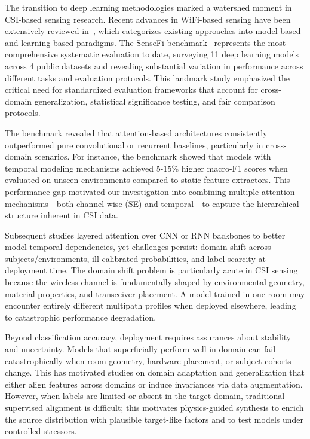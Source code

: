 \documentclass[journal]{IEEEtran}
\begin{document}
The transition to deep learning methodologies marked a watershed moment in CSI-based sensing research. Recent advances in WiFi-based sensing have been extensively reviewed in~\cite{liu2024wifi}, which categorizes existing approaches into model-based and learning-based paradigms. The SenseFi benchmark~\cite{yang2023sensefi} represents the most comprehensive systematic evaluation to date, surveying 11 deep learning models across 4 public datasets and revealing substantial variation in performance across different tasks and evaluation protocols. This landmark study emphasized the critical need for standardized evaluation frameworks that account for cross-domain generalization, statistical significance testing, and fair comparison protocols.

The benchmark revealed that attention-based architectures consistently outperformed pure convolutional or recurrent baselines, particularly in cross-domain scenarios. For instance, the benchmark showed that models with temporal modeling mechanisms achieved 5-15\% higher macro-F1 scores when evaluated on unseen environments compared to static feature extractors. This performance gap motivated our investigation into combining multiple attention mechanisms—both channel-wise (SE) and temporal—to capture the hierarchical structure inherent in CSI data.

Subsequent studies layered attention over CNN or RNN backbones to better model temporal dependencies, yet challenges persist: domain shift across subjects/environments, ill-calibrated probabilities, and label scarcity at deployment time. The domain shift problem is particularly acute in CSI sensing because the wireless channel is fundamentally shaped by environmental geometry, material properties, and transceiver placement. A model trained in one room may encounter entirely different multipath profiles when deployed elsewhere, leading to catastrophic performance degradation.

Beyond classification accuracy, deployment requires assurances about stability and uncertainty. Models that superficially perform well in-domain can fail catastrophically when room geometry, hardware placement, or subject cohorts change. This has motivated studies on domain adaptation and generalization that either align features across domains or induce invariances via data augmentation. However, when labels are limited or absent in the target domain, traditional supervised alignment is difficult; this motivates physics-guided synthesis to enrich the source distribution with plausible target-like factors and to test models under controlled stressors.
\end{document}

